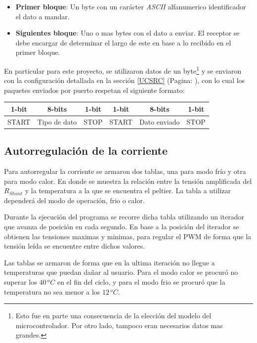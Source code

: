 \documentclass[10pt,spanish,a4paper,openany,notitlepage]{article}
\begin{document}
\begin{itemize}
\item \textbf{Primer bloque}: Un byte con un carácter \textit{ASCII} alfanumerico identificador el dato a mandar.
\item \textbf{Siguientes bloque}: Uno o mas bytes con el dato a enviar. El receptor se debe encargar de determinar el largo de este en base a lo recibido en el primer bloque.
\end{itemize}

En particular para este proyecto, se utilizaron datos de un byte\footnote{Esto fue en parte una consecuencia de la elección del modelo del microcontrolador. Por otro lado, tampoco eran necesarios datos mas grandes.} y se enviaron con la configuración detallada en la sección \ref{UCSRC} (Pagina: \pageref{UCSRC}), con lo cual los paquetes enviados por puerto respetan el siguiente formato:

\begin{center}
\begin{tabular}{|c|c|c|c|c|c|}\hline
1-bit&8-bits&1-bit&1-bit&8-bits&1-bit\\\hline
START&Tipo de dato&STOP&START&Dato enviado&STOP\\\hline
\end{tabular}
\end{center}

\subsection{Autorregulación de la corriente}

Para autorregular la corriente se armaron dos tablas, una para modo frío
y otra para modo calor. En donde se muestra la relación entre la tensión
amplificada del $R_{Shunt}$ y la temperatura a la que se encuentra el peltier.
La tabla a utilizar dependerá del modo de operación, frio o calor.

Durante la ejecución del programa se recorre dicha tabla utilizando un iterador
que avanza de posición en cada segundo. En base a la posición del iterador
se obtienen las tensiones maximas y minimas, para regular el PWM de forma
que la tensión leída se encuentre entre dichos valores.

Las tablas se armaron de forma que en la ultima iteración no llegue a temperaturas
que puedan dañar al usuario. Para el modo calor se procuró no superar los
$40\, \unit{^oC}$ en el fin del ciclo, y para el modo frio se procuró que
la temperatura no sea menor a los $12\, \unit{^oC}$.
\end{document}
